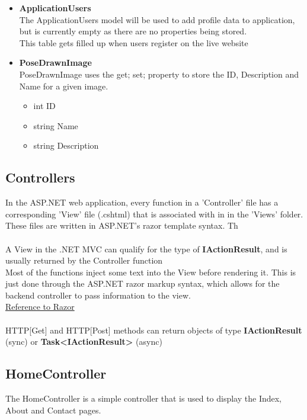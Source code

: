 \documentclass{scrreprt}
\begin{document}
    \begin{itemize}
      \item \textbf{ApplicationUsers}
      \\
      The ApplicationUsers model will be used to add profile data to application, but is currently empty as there are no properties being stored.
      \\
      This table gets filled up when users register on the live website

      \item \textbf{PoseDrawnImage}
      \\
      PoseDrawnImage uses the {get; set;} property to store the ID, Description and Name for a given image.

      \begin{itemize}
        \item int ID
        \item string Name
        \item string Description
      \end{itemize}

    \end{itemize}

\subsection{Controllers}

In the ASP.NET web application, every function in a 'Controller' file has a corresponding 'View' file (.cshtml) that is associated with in in the 'Views' folder. These files are written in ASP.NET's razor template syntax. Th
\\\\
A View in the .NET MVC can qualify for the type of \textbf{IActionResult}, and is usually returned by the Controller function
\\
Most of the functions inject some text into the View before rendering it. This is just done through the ASP.NET razor markup syntax, which allows for the backend controller to pass information to the view.
\\
\href{https://docs.microsoft.com/en-us/aspnet/core/mvc/views/razor}{Reference to Razor}
\\\\
HTTP[Get] and HTTP[Post] methods can return objects of type \textbf{IActionResult} (sync) or \textbf{Task\textless IActionResult\textgreater} (async)

\subsection{HomeController}
The HomeController is a simple controller that is used to display the Index, About and Contact pages.
\end{document}
